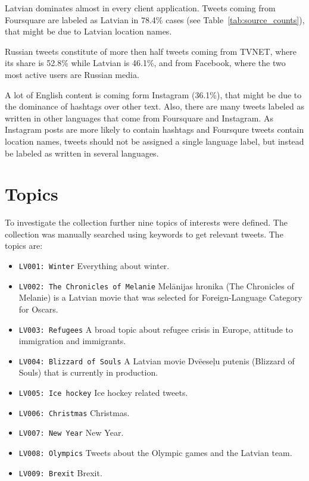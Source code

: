 \documentclass{IOS-Book-Article}
\newcommand{\hl}[1]{#1}
\begin{document}

Latvian dominates almost in every client application. Tweets coming from Foursquare are labeled as Latvian in \hl{78.4\%} cases (see Table~\ref{tab:source_counts}), that might be due to Latvian location names.

Russian tweets constitute of more then half tweets coming from TVNET, where its share is \hl{52.8\%} while Latvian is \hl{46.1\%}, and from Facebook, where the two most active users are Russian media.

A lot of English content is coming form Instagram (\hl{36.1\%}), that might be due to the dominance of hashtags over other text. Also, there are many tweets labeled as written in other languages that come from Foursquare and Instagram. As Instagram posts are more likely to contain hashtags and Foursqure tweets contain location names, tweets should not be assigned a single language label, but instead be labeled as written in several languages.



\section{Topics}
\label{sec:topics}

To investigate the collection further nine topics of interests were defined. The collection was manually searched using keywords to get relevant tweets. The topics are:
\begin{itemize}
\item \texttt{LV001: Winter} Everything about winter.
\item \texttt{LV002: 
The Chronicles of Melanie} Mel\=anijas hronika (The Chronicles of Melanie) is a Latvian movie that was selected for Foreign-Language Category for Oscars.
\item \texttt{LV003: Refugees} A broad topic about refugee crisis in Europe, attitude to immigration and immigrants.
\item \texttt{LV004: Blizzard of Souls} A Latvian movie Dv\=eese\c{l}u putenis (Blizzard of Souls) that is currently in production.
\item \texttt{LV005: Ice hockey} Ice hockey related tweets.
\item \texttt{LV006: Christmas} Christmas.
\item \texttt{LV007: New Year} New Year.
\item \texttt{LV008: Olympics} Tweets about the Olympic games and the Latvian team.
\item \texttt{LV009: Brexit} Brexit.
\end{itemize}
\end{document}
